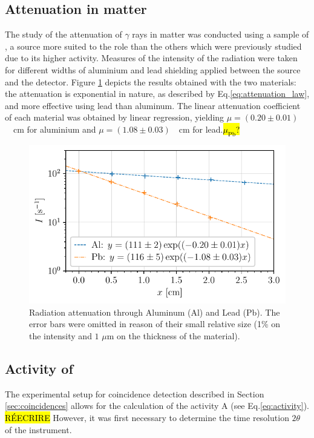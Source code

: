 \subsection{Attenuation in matter}
The study of the attenuation of $\gamma$ rays in matter was conducted using 
a sample of \cesium, a source more suited to the role than 
the others which were previously studied due to its higher activity\footnotemark.
Measures of the intensity of the radiation were taken for
different widths of aluminium and lead shielding applied 
between the source and the detector.
Figure \ref{fig:attenuation_coefficient} depicts the results obtained with 
the two materials:
the attenuation is exponential in nature, as described 
by Eq.\eqref{eq:attenuation_law}, and more effective using lead than aluminum.
The linear attenuation coefficient of each material was obtained by linear regression, yielding \mbox{$\mu = (0.20 \pm 0.01)$ \unit{\per\cm}} for aluminium
and \mbox{$\mu = (1.08 \pm 0.03)$ \unit{\per\cm}} for lead.\hl{$\mu_{\mathrm{Pb}}$?}
\begin{figure}[htbp]
    \centering
    \includegraphics[scale=1]{figures/attenuation_coefficient.pdf}
    \caption{Radiation attenuation through Aluminum (Al) and Lead (Pb). 
             The error bars were omitted in reason of their small relative size 
             (1\% on the intensity and $1$ $\mu$m on the thickness of the material).}
    \label{fig:attenuation_coefficient}
\end{figure}

\subsection{Activity of \cobalt}
The experimental setup for coincidence detection described in Section \ref{sec:coincidences} allows for the calculation
of the activity A (see Eq.\eqref{eq:activity}). \hl{RÉECRIRE}
However, it was first necessary to determine the time resolution $2\theta$ of 
the instrument.

